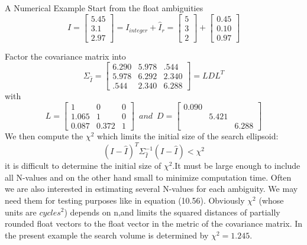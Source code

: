 A Numerical Example Start from the float ambiguities
\begin{equation}
\hat{I}=
\begin{bmatrix}
5.45\\
3.1\\
2.97
\end{bmatrix}
=I_{integer}+\hat{I}_{r}
=\begin{bmatrix}
5\\
3\\
2
\end{bmatrix}+
\begin{bmatrix}
0.45\\
0.10\\
0.97
\end{bmatrix}
\end{equation}

Factor the covariance matrix into
\begin{equation}
\Sigma_{\hat{I}}=
\begin{bmatrix}
6.290&5.978&.544\\
5.978&6.292&2.340\\
.544&2.340&6.288
\end{bmatrix}
=LDL^{T}
\end{equation}
with
\begin{equation}
L=
\begin{bmatrix}
1&0&0\\
1.065&1&0\\
0.087&0.372&1
\end{bmatrix}\,\,\,
and \,\,\,
D=
\begin{bmatrix}
0.090&&\\
&5.421&\\
&&6.288
\end{bmatrix}
\end{equation}
We then compute the $\chi^{2}$ which limits the initial size of the search ellipsoid:
$$
(I-\hat{I})^{T}\Sigma_{\hat{I}}^{-1}(I-\hat{I})<\chi^{2}
$$
it is difficult to determine the initial size of $\chi^{2}$.It must be large enough to include all N-values and on the other hand small to minimize computation time. Often we are also interested in estimating several N-values for each ambiguity. We may need them for testing purposes like in equation (10.56). Obviously $\chi^{2}$ (whose units are $cycles^{2}$) depends on n,and limits the squared distances of partially rounded float vectors to the float vector in the metric of the covariance matrix. In the present example the search volume is determined by $\chi^{2}=1.245$.


